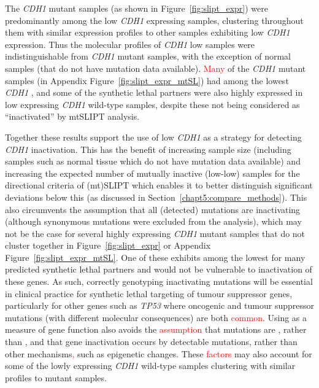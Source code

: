 
The \textit{CDH1} \gls{mutant} samples (as shown in Figure~\ref{fig:slipt_expr}) were predominantly among the low \textit{CDH1} expressing samples, clustering throughout them with similar expression profiles to other samples exhibiting low \textit{CDH1} expression. Thus the molecular profiles of \textit{CDH1} low samples were indistinguishable from \textit{CDH1} \gls{mutant} samples, with the exception of normal samples (that do not have  \gls{mutation} data available). \textcolor{red}{Many} of the \textit{CDH1} \gls{mutant} samples (in Appendix Figure~\ref{fig:slipt_expr_mtSL}) had among the lowest \textit{CDH1} , and some of the \gls{synthetic lethal} partners were also highly expressed in low expressing \textit{CDH1} \gls{wild-type} samples, despite these not being considered as ``inactivated'' by \acrshort{mtSLIPT} analysis.

Together these results support the use of low \textit{CDH1}  as a strategy for detecting \textit{CDH1} inactivation. This has the benefit of increasing sample size (including samples such as normal tissue which do not have  \gls{mutation} data available) and increasing the expected number of mutually inactive (low-low) samples for the directional criteria of (mt)\gls{SLIPT} which enables it to better distinguish significant deviations below this (as discussed in Section~\ref{chapt5:compare_methods}). This also circumvents the assumption that all (detected) \glspl{mutation} are inactivating (although synonymous \glspl{mutation} were excluded from the analysis), which may not be the case for several highly expressing \textit{CDH1} \gls{mutant} samples that do not cluster together in Figure~\ref{fig:slipt_expr} or Appendix Figure~\ref{fig:slipt_expr_mtSL}. One of these exhibits among the lowest  for many predicted \gls{synthetic lethal} partners and would not be vulnerable to inactivation of these genes. As such, correctly genotyping inactivating \glspl{mutation} will be \gls{essential} in clinical practice for \gls{synthetic lethal} targeting of \gls{tumour suppressor} genes, particularly for other genes such as \textit{TP53} where oncogenic and \gls{tumour suppressor} \glspl{mutation} (with different molecular consequences) are both \textcolor{red}{common}. Using  as a measure of gene function also avoids the \textcolor{red}{assumption} that \glspl{mutation} are , rather than , and that gene inactivation occurs by detectable \glspl{mutation}, rather than other mechanisms\textcolor{red}{,} such as epigenetic changes. These \textcolor{red}{factors} may also account for some of the lowly expressing \textit{CDH1} \gls{wild-type} samples clustering with similar profiles to \gls{mutant} samples.

